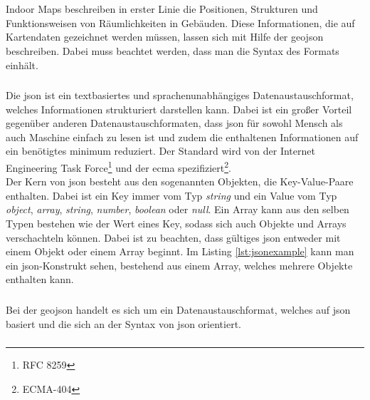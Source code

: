 \chapter{
}

\section{
}
Indoor Maps beschreiben in erster Linie die Positionen, Strukturen und Funktionsweisen von Räumlichkeiten in Gebäuden. Diese Informationen, die auf Kartendaten gezeichnet werden müssen, lassen sich mit Hilfe der \ac{geojson} beschreiben. Dabei muss beachtet werden, dass man die Syntax des Formats einhält.

\subsection{
}
Die \ac{json} ist ein textbasiertes und sprachenunabhängiges Datenaustauschformat, welches Informationen strukturiert darstellen kann. Dabei ist ein großer Vorteil gegenüber anderen Datenaustauschformaten, dass \ac{json} für sowohl Mensch als auch Maschine einfach zu lesen ist und zudem die enthaltenen Informationen auf ein benötigtes minimum reduziert. Der Standard wird von der Internet Engineering Task Force\footnote{RFC 8259} und der \ac{ecma} spezifiziert\footnote{ECMA-404}.\\[1em]%
%
Der Kern von \ac{json} besteht aus den sogenannten Objekten, die Key-Value-Paare enthalten. Dabei ist ein Key immer vom Typ \textit{string} und ein Value vom Typ \textit{object}, \textit{array}, \textit{string}, \textit{number}, \textit{boolean} oder \textit{null}. Ein Array kann aus den selben Typen bestehen wie der Wert eines Key, sodass sich auch Objekte und Arrays verschachteln können. Dabei ist zu beachten, dass gültiges \ac{json} entweder mit einem Objekt oder einem Array beginnt. Im Listing \ref{lst:jsonexample} kann man ein \ac{json}-Konstrukt sehen, bestehend aus einem Array, welches mehrere Objekte enthalten kann.

\subsection{
}
Bei der \ac{geojson} handelt es sich um ein Datenaustauschformat, welches auf \ac{json} basiert und die sich an der Syntax von \ac{json} orientiert.

\subsection{
}
